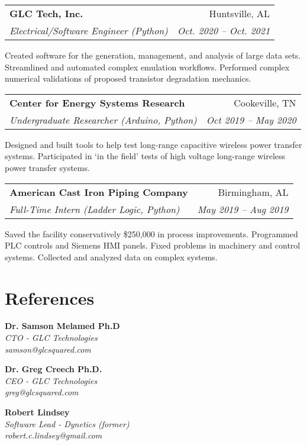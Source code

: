 \documentclass[letterpaper,11pt]{article}
\makeatletter
\newcommand{\resumeSubheading}[4]{
    \begin{tabular*}{0.97\textwidth}{l@{\extracolsep{\fill}}r}
      \textbf{#1} & #2 \\
      \textit{\small#3} & \textit{\small #4} \\
    \end{tabular*}
}
\newcommand{\Referance}[3]{
  \textbf{#1} \\
  \textit{#2} \\
  \textit{\small #3} \\
}
\makeatother
\begin{document}
\bigskip
\resumeSubheading
{GLC Tech, Inc.}{Huntsville, AL}
{Electrical/Software Engineer \small (Python)}{Oct. 2020 – Oct. 2021}
  Created software for the generation, management, and analysis of large data sets. Streamlined and automated complex emulation workflows. Performed complex numerical validations of proposed transistor degradation mechanics.

\bigskip
\resumeSubheading
{Center for Energy Systems Research}{Cookeville, TN}
{Undergraduate Researcher \small (Arduino, Python)}{Oct 2019 – May 2020}
  Designed and built tools to help test long-range capacitive wireless power transfer systems. Participated in ‘in the field’ tests of high voltage long-range wireless power transfer systems.

\bigskip
\resumeSubheading
{American Cast Iron Piping Company}{Birmingham, AL}
{Full-Time Intern \small (Ladder Logic, Python)}{May 2019 – Aug 2019}
  Saved the facility conservatively \$250,000 in process improvements. Programmed PLC controls and Siemens HMI panels. Fixed problems in machinery and control systems. Collected and analyzed data on complex systems.

\section{References}
\begin{multicols}{3}
\Referance{Dr. Samson Melamed Ph.D}{CTO - GLC Technologies}{samson@glcsquared.com}

\columnbreak
\Referance{Dr. Greg Creech Ph.D.}{CEO - GLC Technologies}{greg@glcsquared.com}

\columnbreak
\Referance{Robert Lindsey}{Software Lead - Dynetics \footnotesize (former)}{robert.c.lindsey@gmail.com}

\end{multicols}
\end{document}
